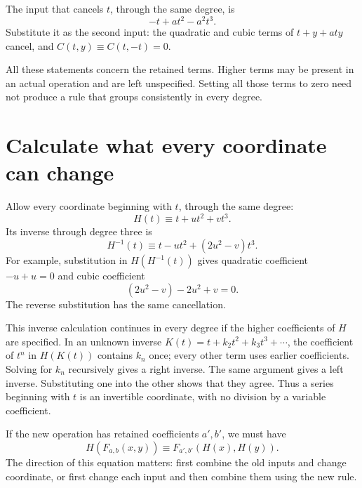 \documentclass[11pt,letterpaper]{article}
\numberwithin{equation}{section}
\theoremstyle{definition}\newtheorem{example}[theorem]{Example}
\begin{document}
The input that cancels \(t\), through the same degree, is
\[
 -t+at^2-a^2t^3.
\]
Substitute it as the second input: the quadratic and cubic terms of \(t+y+a ty\) cancel, and \(C(t,y)\equiv C(t,-t)=0\).

All these statements concern the retained terms. Higher terms may be present in an actual operation and are left unspecified. Setting all those terms to zero need not produce a rule that groups consistently in every degree.

\section{Calculate what every coordinate can change}\label{sec:coordinate-action}

Allow every coordinate beginning with \(t\), through the same degree:
\begin{equation}\label{eq:coordinate-jet}
 H(t)\equiv t+ut^2+vt^3.
\end{equation}
Its inverse through degree three is
\begin{equation}\label{eq:coordinate-inverse}
 H^{-1}(t)\equiv t-ut^2+(2u^2-v)t^3.
\end{equation}
For example, substitution in \(H(H^{-1}(t))\) gives quadratic coefficient \(-u+u=0\) and cubic coefficient
\[
 (2u^2-v)-2u^2+v=0.
\]
The reverse substitution has the same cancellation.

This inverse calculation continues in every degree if the higher coefficients of \(H\) are specified. In an unknown inverse \(K(t)=t+k_2t^2+k_3t^3+\cdots\), the coefficient of \(t^n\) in \(H(K(t))\) contains \(k_n\) once; every other term uses earlier coefficients. Solving for \(k_n\) recursively gives a right inverse. The same argument gives a left inverse. Substituting one into the other shows that they agree. Thus a series beginning with \(t\) is an invertible coordinate, with no division by a variable coefficient.

If the new operation has retained coefficients \(a',b'\), we must have
\begin{equation}\label{eq:coordinate-bridge}
 H(F_{a,b}(x,y))\equiv F_{a',b'}(H(x),H(y)).
\end{equation}
The direction of this equation matters: first combine the old inputs and change coordinate, or first change each input and then combine them using the new rule.
\end{document}
